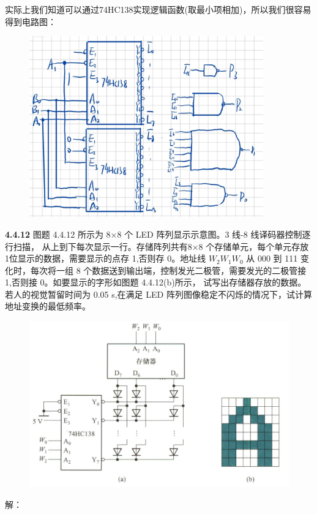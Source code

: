 \documentclass[a4paper,11pt,UTF8]{article}
\begin{document}
实际上我们知道可以通过74HC138实现逻辑函数(取最小项相加)，所以我们很容易得到电路图：
\begin{figure}[H]
	\centering
	\includegraphics[width=0.9\textwidth]{4.4.9_4}
\end{figure}
\textbf{4.4.12} 图题 4.4.12 所示为 8×8 个 LED 阵列显示示意图。3 线-8 线译码器控制逐行扫描， 从上到下每次显示一行。存储阵列共有8×8 个存储单元，每个单元存放 1位显示的数据，需要显示的点存 1,否则存 0。地址线 $W_2W_1W_0$ 从 000 到 111 变化时，每次将一组 8 个数据送到输出端，控制发光二极管，需要发光的二极管接 1,否则接 0。如要显示的字形如图题 4.4.12(b)所示， 试写出存储器存放的数据。若人的视觉暂留时间为 0.05 s,在满足 LED 阵列图像稳定不闪烁的情况下，试计算地址变换的最低频率。
\begin{figure}[H]
	\centering
	\includegraphics[width=1\textwidth]{4.4.12}
\end{figure}
解：
\end{document}
